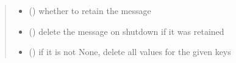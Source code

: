 \documentclass[letterpaper,10pt,english]{sphinxmanual}
\begin{document}
\begin{fulllineitems}
\begin{quote}
\begin{description}
\begin{itemize}
\item {} 
 () \textendash{} whether to retain the message

\item {} 
 () \textendash{} delete the message on shutdown if it was retained

\item {} 
 () \textendash{} if it is not None, delete all values for the given keys

\end{itemize}

\end{description}\end{quote}

\end{fulllineitems}

\end{document}
